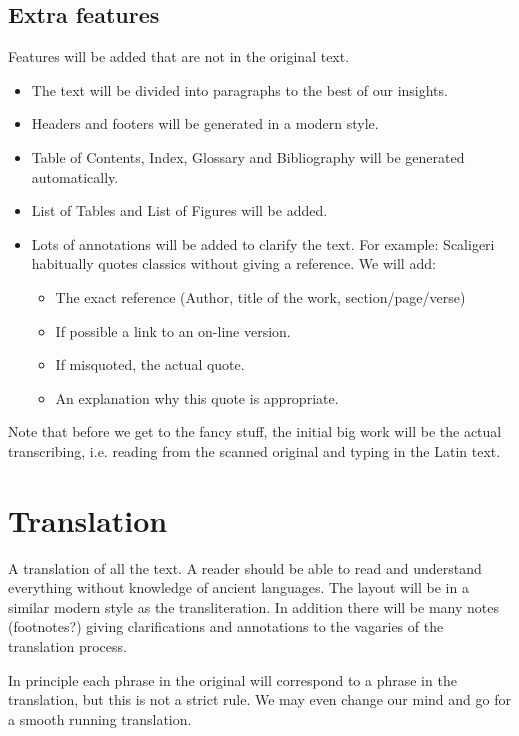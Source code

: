 \documentclass{report}
\begin{document}
\subsection{Extra features}
Features will be added that are not in the original text.
\begin{itemize}
\item The text will be divided into paragraphs to the best of our insights.
\item Headers and footers will be generated in a modern style.
\item Table of Contents, Index, Glossary and Bibliography will be generated
automatically.
\item List of Tables and List of Figures will be added.
\item Lots of annotations will be added to clarify the text.
For example: Scaligeri habitually quotes classics without giving a reference.
We will add:
    \begin{itemize}
    \item The exact reference (Author, title of the work, section/page/verse)
    \item If possible a link to an on-line version.
    \item If misquoted, the actual quote.
    \item An explanation why this quote is appropriate.
    \end{itemize}
\end{itemize}

Note that before we get to the fancy stuff, the initial big work will be
 the actual transcribing,
i.e. reading from the scanned original and typing in the Latin text.

\section{Translation}
A translation of all the text.
A reader should be able to read and understand everything without knowledge
of ancient languages.
The layout will be in a similar modern style as the transliteration.
In addition there will be many notes 
(footnotes?) giving clarifications and annotations to the vagaries of the
translation process.

In principle each phrase in the original will correspond to a phrase in the
translation, but this is not a strict rule.
We may even change our mind and go for a smooth running translation.


\end{document}
